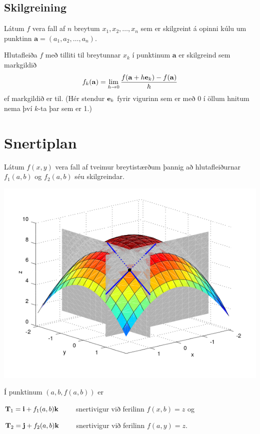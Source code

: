\documentclass[a4paper,10pt,icelandic]{sphinxmanual}
\begin{document}
\subsection{Skilgreining}
\label{Kafli2:id12}
Látum \(f\) vera fall af \(n\) breytum
\(x_1,x_2,\ldots,x_n\) sem er skilgreint á opinni kúlu um punktinn
\(\mathbf{a}=(a_1, a_2, \ldots, a_n).\)

Hlutafleiða \(f\) með tilliti til breytunnar \(x_k\) í punktinum
\(\mathbf{a}\) er skilgreind sem markgildið
\begin{gather}
\begin{split}\displaystyle f_k(\mathbf{a})=\lim_{h\rightarrow 0}\frac{f(\mathbf{a}+h\mbox{${\bf e}$}_k)-f(\mathbf{a})}{h}\end{split}\notag
\end{gather}
ef markgildið er til. (Hér stendur \(\mbox{${\bf e}$}_k\) fyrir
vigurinn sem er með 0 í öllum hnitum nema því \(k\)-ta þar sem er
1.)


\section{Snertiplan}
\label{Kafli2:snertiplan}
Látum \(f(x,y)\) vera fall af tveimur breytistærðum þannig að
hlutafleiðurnar \(f_1(a,b)\) og \(f_2(a,b)\) séu skilgreindar.

{\hfill\includegraphics[width=0.600\linewidth]{bothpart.png}\hfill}

Í punktinum \((a,b,f(a,b))\) er

\(\mbox{${\bf T}$}_1 = \mbox{${\bf i}$}+ f_1(a,b)\mbox{${\bf k}$}\qquad\)
snertivigur við ferilinn \(f(x,b) = z\) og

\(\mbox{${\bf T}$}_2 = \mbox{${\bf j}$}+ f_2(a,b)\mbox{${\bf k}$}\qquad\)
snertivigur við ferilinn \(f(a,y) = z\).
\end{document}
